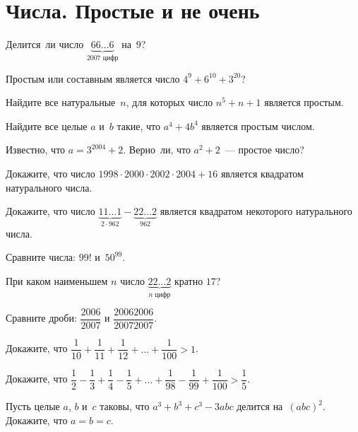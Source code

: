 
\section*{Числа. Простые и не очень}


\begin{problems}

\item
Делится~ли число
\(
    \underbrace{66 {\ldots} 6}_{\text{$2007$ цифр}}
\)
на~$9$?

\item
Простым или составным является число $4^{9} + 6^{10} + 3^{20}$?

\item
Найдите все натуральные~$n$, для которых число $n^5 + n + 1$ является простым.

\item
Найдите все целые $a$ и~$b$ такие, что $a^4 + 4 b^4$ является простым числом.

\item
Известно, что $a = 3^{2004} + 2$.
Верно~ли, что $a^2 + 2$~--- простое число?

\item
Докажите, что число $1998 \cdot 2000 \cdot 2002 \cdot 2004 + 16$ является
квадратом натурального числа.

\item
Докажите, что число
\(
    \underbrace{11 {\ldots} 1}_{2 \cdot 962}
    -
    \underbrace{22 {\ldots} 2}_{962}
\)
является квадратом некоторого натурального числа.

\item
Сравните числа: $99!$ и~$50^{99}$.

\item
При каком наименьшем $n$ число
\(
    \underbrace{22 {\ldots} 2}_{\text{$n$ цифр}}
\)
кратно $17$?

\item
Сравните дроби:\enspace
$\dfrac{2006}{2007}$\enspace
и\enspace
$\dfrac{20062006}{20072007}$.

\item
Докажите, что\enspace
\(
    \dfrac{1}{10} + \dfrac{1}{11} + \dfrac{1}{12}
    + \ldots +
    \dfrac{1}{100}
>
    1
\).

\item
Докажите, что\enspace
\(
    \dfrac{1}{2} - \dfrac{1}{3} + \dfrac{1}{4} - \dfrac{1}{5}
    + \ldots +
    \dfrac{1}{98} - \dfrac{1}{99} + \dfrac{1}{100}
>
    \dfrac{1}{5}
\).

\item
Пусть целые $a$, $b$ и~$c$ таковы, что $a^3 + b^3 + c^3 - 3 a b c$
делится на~$(a b c)^2$.
Докажите, что $a = b = c$.

\end{problems}

